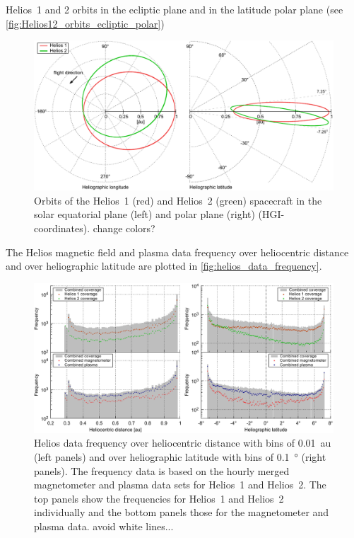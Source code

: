Helios~1 and 2 orbits in the ecliptic plane and in the latitude polar plane (see \autoref{fig:Helios12_orbits_ecliptic_polar})\\
\begin{figure}[htb]
	\centering
	\includegraphics[width=\textwidth]{images/gnuplots/Helios12_orbits_ecliptic_polar.pdf}
	\caption{Orbits of the Helios~1 (red) and Helios~2 (green) spacecraft in the solar equatorial plane (left) and polar plane (right) (HGI-coordinates). change colors?}
	\label{fig:Helios12_orbits_ecliptic_polar}
\end{figure}

The Helios magnetic field and plasma data frequency over heliocentric distance and over heliographic latitude are plotted in \autoref{fig:helios_data_frequency}.\\
\begin{figure}[htb]
	\centering
	\includegraphics[width=\textwidth]{images/gnuplots/helios_data_frequency.pdf}
	\caption{Helios data frequency over heliocentric distance with bins of \SI{0.01}{au} (left panels) and over heliographic latitude with bins of \SI{0.1}{\degree} (right panels). The frequency data is based on the hourly merged magnetometer and plasma data sets for Helios~1 and Helios~2. The top panels show the frequencies for Helios~1 and Helios~2 individually and the bottom panels those for the magnetometer and plasma data. avoid white lines...}
	\label{fig:helios_data_frequency}
\end{figure}

